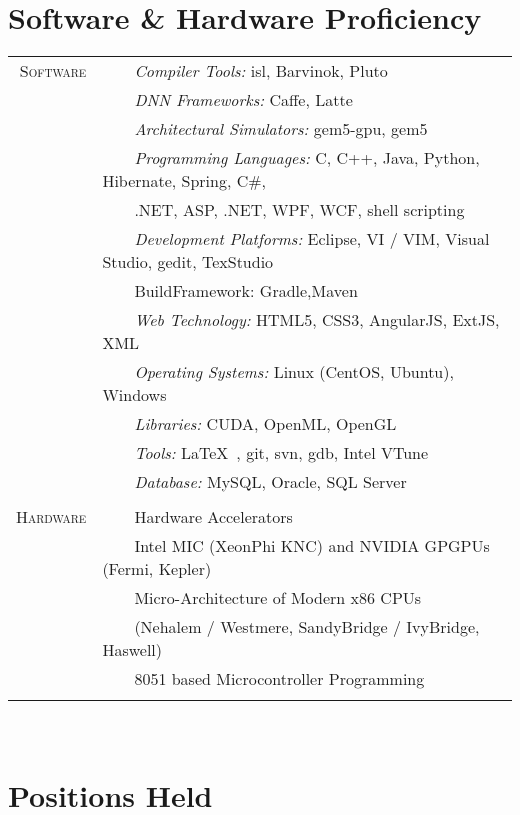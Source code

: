 \documentclass[a4paper,10pt]{article} %
\newcommand{\tabitem}{~~\llap{\textbullet}~~}
\begin{document}
\section{Software \& Hardware Proficiency}
\begin{tabular}{rl}
\textsc{Software} & \tabitem \textit{Compiler Tools:} isl, Barvinok, Pluto\\
& \tabitem \textit{DNN Frameworks:} Caffe, Latte\\
& \tabitem \textit{Architectural Simulators:} gem5-gpu, gem5\\
& \tabitem \textit{Programming Languages:} C, C++, Java, Python, Hibernate, Spring, C\#,\\
& ~~~~.NET, ASP, .NET, WPF, WCF, shell scripting\\
& \tabitem \textit{Development Platforms:} Eclipse, VI / VIM, Visual Studio, gedit, TexStudio\\
& \tabitem{BuildFramework:} Gradle,Maven \\
& \tabitem \textit{Web Technology:} HTML5, CSS3, AngularJS, ExtJS, XML\\
& \tabitem \textit{Operating Systems:} Linux (CentOS, Ubuntu), Windows \\
& \tabitem \textit{Libraries:} CUDA, OpenML, OpenGL  \\
& \tabitem \textit{Tools:} \LaTeX\ , git, svn, gdb, Intel VTune\\
& \tabitem \textit{Database:} MySQL, Oracle, SQL Server\\

&\\

\textsc{Hardware}  & \tabitem Hardware Accelerators \\
& ~~~~Intel MIC (XeonPhi KNC) and NVIDIA GPGPUs (Fermi, Kepler) \\
& \tabitem Micro-Architecture of Modern x86 CPUs\\
& ~~~~(Nehalem / Westmere, SandyBridge / IvyBridge, Haswell) \\ 
& \tabitem 8051 based Microcontroller Programming \\
&\\
\end{tabular}
\\

\section{Positions Held}
\end{document}
